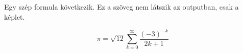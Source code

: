 \documentclass{article}
\begin{document}
 
	Egy szép formula következik. Ez a szöveg nem látszik az outputban, csak a képlet.
\begin{preview} 
\[ 
\pi = \sqrt{12}\sum^\infty_{k=0} \frac{ (-3)^{-k} }{ 2k+1 } 
\] 
\end{preview} 
\end{document}
